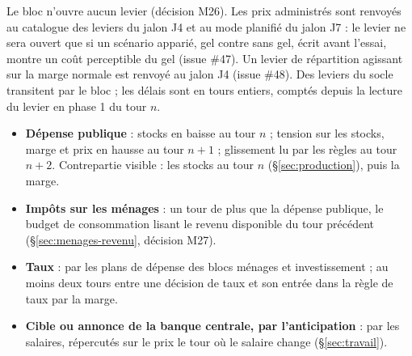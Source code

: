 \documentclass[11pt,a4paper]{article}
\begin{document}
\begin{joueur}[prix]
Le bloc n'ouvre aucun levier (décision M26). Les prix administrés sont renvoyés au catalogue des leviers du jalon J4 et au mode planifié du jalon J7 : le levier ne sera ouvert que si un scénario apparié, gel contre sans gel, écrit avant l'essai, montre un coût perceptible du gel (issue \#47). Un levier de répartition agissant sur la marge normale est renvoyé au jalon J4 (issue \#48). Des leviers du socle transitent par le bloc ; les délais sont en tours entiers, comptés depuis la lecture du levier en phase 1 du tour $n$.
\begin{itemize}
\item \textbf{Dépense publique} : stocks en baisse au tour $n$ ; tension sur les stocks, marge et prix en hausse au tour $n + 1$ ; glissement lu par les règles au tour $n + 2$. Contrepartie visible : les stocks au tour $n$ (\S\ref{sec:production}), puis la marge.
\item \textbf{Impôts sur les ménages} : un tour de plus que la dépense publique, le budget de consommation lisant le revenu disponible du tour précédent (\S\ref{sec:menages-revenu}, décision M27).
\item \textbf{Taux} : par les plans de dépense des blocs ménages et investissement ; au moins deux tours entre une décision de taux et son entrée dans la règle de taux par la marge.
\item \textbf{Cible ou annonce de la banque centrale, par l'anticipation} : par les salaires, répercutés sur le prix le tour où le salaire change (\S\ref{sec:travail}).
\end{itemize}
\end{joueur}
\end{document}
